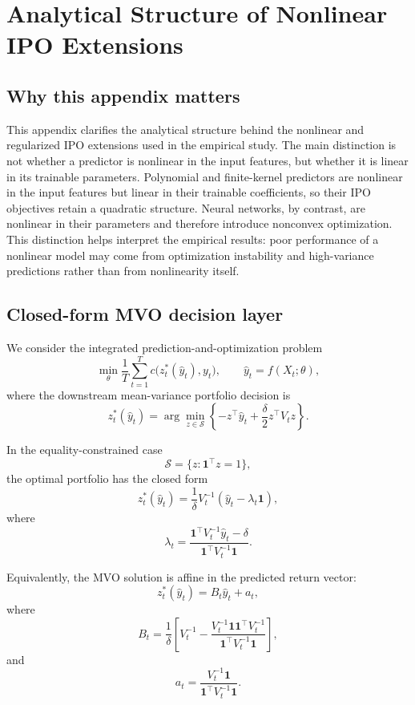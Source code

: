 \documentclass{article}
\begin{document}
\appendix
\section{Analytical Structure of Nonlinear IPO Extensions}

\subsection{Why this appendix matters}

This appendix clarifies the analytical structure behind the nonlinear and
regularized IPO extensions used in the empirical study. The main distinction is
not whether a predictor is nonlinear in the input features, but whether it is
linear in its trainable parameters. Polynomial and finite-kernel predictors are
nonlinear in the input features but linear in their trainable coefficients, so
their IPO objectives retain a quadratic structure. Neural networks, by
contrast, are nonlinear in their parameters and therefore introduce nonconvex
optimization. This distinction helps interpret the empirical results: poor
performance of a nonlinear model may come from optimization instability and
high-variance predictions rather than from nonlinearity itself.

\subsection{Closed-form MVO decision layer}

We consider the integrated prediction-and-optimization problem
\[
\min_{\theta}
\frac{1}{T}\sum_{t=1}^T
c\bigl(z_t^*(\hat y_t), y_t\bigr),
\qquad
\hat y_t = f(X_t;\theta),
\]
where the downstream mean-variance portfolio decision is
\[
z_t^*(\hat y_t)
=
\arg\min_{z\in\mathcal S}
\left\{
-z^\top \hat y_t
+
\frac{\delta}{2}z^\top V_t z
\right\}.
\]

In the equality-constrained case
\[
\mathcal S = \{z: \mathbf 1^\top z = 1\},
\]
the optimal portfolio has the closed form
\[
z_t^*(\hat y_t)
=
\frac{1}{\delta}
V_t^{-1}
\left(
\hat y_t - \lambda_t \mathbf 1
\right),
\]
where
\[
\lambda_t
=
\frac{
\mathbf 1^\top V_t^{-1}\hat y_t - \delta
}{
\mathbf 1^\top V_t^{-1}\mathbf 1
}.
\]

Equivalently, the MVO solution is affine in the predicted return vector:
\[
z_t^*(\hat y_t)
=
B_t \hat y_t + a_t,
\]
where
\[
B_t
=
\frac{1}{\delta}
\left[
V_t^{-1}
-
\frac{
V_t^{-1}\mathbf 1 \mathbf 1^\top V_t^{-1}
}{
\mathbf 1^\top V_t^{-1}\mathbf 1
}
\right],
\]
and
\[
a_t
=
\frac{
V_t^{-1}\mathbf 1
}{
\mathbf 1^\top V_t^{-1}\mathbf 1
}.
\]
\end{document}
